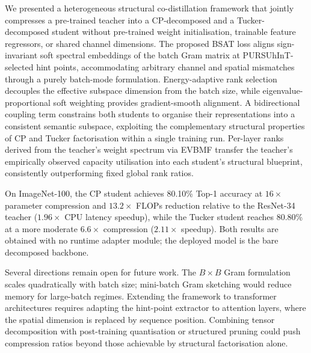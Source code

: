 \documentclass[conference]{IEEEtran}
\begin{document}
We presented a heterogeneous structural co-distillation framework that jointly
compresses a pre-trained teacher into a CP-decomposed and a Tucker-decomposed
student without pre-trained weight initialisation, trainable feature regressors,
or shared channel dimensions. The proposed BSAT loss aligns sign-invariant soft
spectral embeddings of the batch Gram matrix at PURSUhInT-selected hint points,
accommodating arbitrary channel and spatial mismatches through a purely
batch-mode formulation. Energy-adaptive rank selection decouples the effective
subspace dimension from the batch size, while eigenvalue-proportional soft
weighting provides gradient-smooth alignment. A bidirectional coupling term
constrains both students to organise their representations into a consistent
semantic subspace, exploiting the complementary structural properties of CP and
Tucker factorisation within a single training run. Per-layer ranks derived from
the teacher's weight spectrum via EVBMF transfer the teacher's empirically
observed capacity utilisation into each student's structural blueprint,
consistently outperforming fixed global rank ratios.

On ImageNet-100, the CP student achieves 80.10\% Top-1 accuracy at $16\times$
parameter compression and $13.2\times$ FLOPs reduction relative to the
ResNet-34 teacher ($1.96\times$ CPU latency speedup), while the Tucker student
reaches 80.80\% at a more moderate $6.6\times$ compression ($2.11\times$
speedup). Both results are obtained with no runtime adapter module; the deployed
model is the bare decomposed backbone.

Several directions remain open for future work. The $B\!\times\!B$ Gram
formulation scales quadratically with batch size; mini-batch Gram sketching
would reduce memory for large-batch regimes. Extending the framework to
transformer architectures requires adapting the hint-point extractor to
attention layers, where the spatial dimension is replaced by sequence position.
Combining tensor decomposition with post-training quantisation or structured
pruning could push compression ratios beyond those achievable by structural
factorisation alone.



\end{document}
